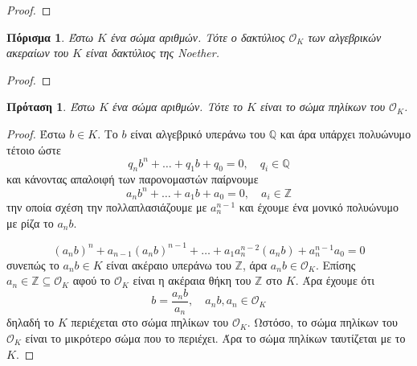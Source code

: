 \documentclass[oneside,a4paper]{article}
\newtheorem{prop}{Πρόταση}
\newtheorem{cor}{Πόρισμα}
\newcommand {\tl}{\textlatin}
\newcommand{\Z}{\mathbb{Z}}
\newcommand{\Q}{\mathbb{Q}}
\begin{document}
\begin{proof}
\end{proof}

\begin{cor}
	Έστω $K$ ένα σώμα αριθμών. Τότε ο δακτύλιος $\mathcal{O}_K$ των αλγεβρικών ακεραίων του $K$ είναι δακτύλιος της \tl{Noether}.
\end{cor}
\begin{proof}
\end{proof}


\begin{prop} Έστω $K$ ένα σώμα αριθμών. Τότε το $K$ είναι το σώμα πηλίκων του $\mathcal{O}_K$.
\end{prop}

\begin{proof}
	Έστω $b \in K$. Το $b$ είναι αλγεβρικό υπεράνω του $\Q$ και άρα υπάρχει πολυώνυμο τέτοιο ώστε 
	$$q_n b^n + \ldots + q_1 b + q_0 = 0, \quad q_i \in \Q$$ και κάνοντας απαλοιφή των παρονομαστών παίρνουμε
	$$a_n b^n + \ldots + a_1 b + a_0 = 0, \quad a_i \in \Z$$ την οποία σχέση την πολλαπλασιάζουμε με $a^{n-1}_n$ και έχουμε ένα μονικό πολυώνυμο με ρίζα το $a_n b$.

	$$(a_n b)^n + a_{n-1}(a_n b)^{n-1} + \ldots + a_1 a^{n-2}_{n}(a_n b) + a^{n-1}_n a_0 = 0$$ συνεπώς το $a_n b \in K$ είναι ακέραιο υπεράνω του $\Z$, άρα $a_n b \in \mathcal{O}_K$. Επίσης $a_n \in \Z \subseteq \mathcal{O}_K$ αφού το $\mathcal{O}_K$ είναι η ακέραια θήκη του $\Z$ στο $K$. Άρα έχουμε ότι $$b = \frac{a_n b}{a_n}, \quad a_n b, a_n \in \mathcal{O}_K$$ δηλαδή το $K$ περιέχεται στο σώμα πηλίκων του $\mathcal{O}_K$. Ωστόσο, το σώμα πηλίκων του $\mathcal{O}_K$ είναι το μικρότερο σώμα που το περιέχει. Άρα το σώμα πηλίκων ταυτίζεται με το $K$.
\end{proof}
\end{document}
